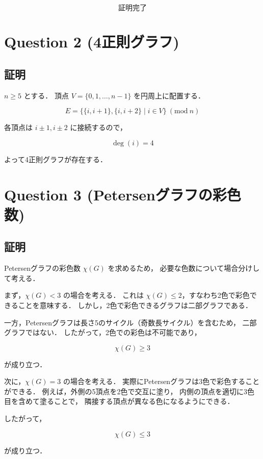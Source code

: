 \documentclass[uplatex,a4paper,11pt]{jsarticle}
\begin{document}
\[
\boxed{\text{証明完了}}
\]


\section*{Question 2 (4正則グラフ)}

\subsection*{証明}

$n \ge 5$ とする．  
頂点 $V=\{0,1,\dots,n-1\}$ を円周上に配置する．

\[
E = \{\{i,i+1\}, \{i,i+2\} \mid i \in V\} \ (\mathrm{mod}\ n)
\]

各頂点は $i\pm1, i\pm2$ に接続するので，

\[
\deg(i)=4
\]

よって4正則グラフが存在する．



\section*{Question 3 (Petersenグラフの彩色数)}

\subsection*{証明}

Petersenグラフの彩色数 $\chi(G)$ を求めるため，
必要な色数について場合分けして考える．

まず，$\chi(G) < 3$ の場合を考える．  
これは $\chi(G) \le 2$，すなわち2色で彩色できることを意味する．  
しかし，2色で彩色できるグラフは二部グラフである．

一方，Petersenグラフは長さ5のサイクル（奇数長サイクル）を含むため，
二部グラフではない．  
したがって，2色での彩色は不可能であり，

\[
\chi(G) \ge 3
\]

が成り立つ．

次に，$\chi(G) = 3$ の場合を考える．  
実際にPetersenグラフは3色で彩色することができる．
例えば，外側の5頂点を2色で交互に塗り，
内側の頂点を適切に3色目を含めて塗ることで，
隣接する頂点が異なる色になるようにできる．

したがって，

\[
\chi(G) \le 3
\]

が成り立つ．
\end{document}

